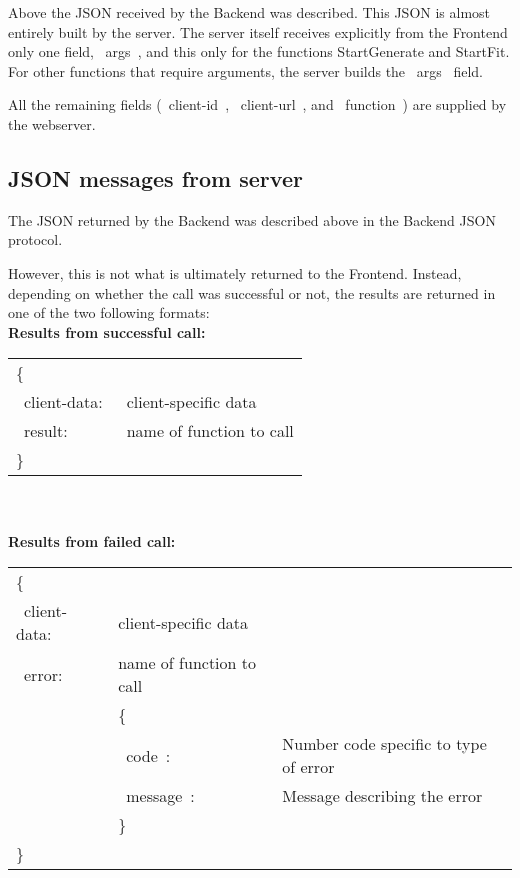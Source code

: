 \documentclass[12pt]{article}
\begin{document}
Above the JSON received by the Backend was described. This JSON is almost entirely built by the server. The server itself receives explicitly from the Frontend only one field, ~args~, and this only for the functions StartGenerate and StartFit. For other functions that require arguments, the server builds the ~args~ field.

All the remaining fields (~client-id~, ~client-url~, and ~function~) are supplied by the webserver.

\subsection{JSON messages from server}

The JSON returned by the Backend was described above in the Backend JSON protocol.

However, this is not what is ultimately returned to the Frontend. Instead, depending on whether the call was successful or not, the results are returned in one of the two following formats:
\\


\noindent \textbf{Results from successful call:}
\\

\begin{tabular}{l l}
	\{ \\
	~client-data:~ &  client-specific data\\ 
	~result:~ & name of function to call\\ 
	\} 
\end{tabular} 
\\
\\

\noindent \textbf{Results from failed call:}
\\

\begin{tabular}{l l l}
	\{ \\
	~client-data:~ &  client-specific data & \\ 
	~error:~ & name of function to call &\\ 
	&	\{\\
	& ~code~: & Number code specific to type of error\\
	& ~message~: & Message describing the error\\
	&	\} \\
	\}
\end{tabular} 
\\
\\
\end{document}
